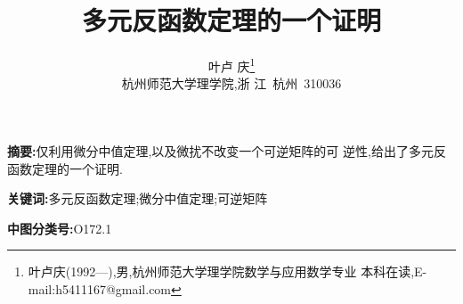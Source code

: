 \documentclass[twoside,11pt]{article}
\begin{document}
\title{\huge{\textbf{多元反函数定理的一个证明}}} \author{\small{叶卢
    庆\footnote{叶卢庆(1992---),男,杭州师范大学理学院数学与应用数学专业
      本科在读,E-mail:h5411167@gmail.com}}\\{\small{杭州师范大学理学院,浙
      江~杭州~310036}}} \date{}
\maketitle
  


\textbf{\small{摘要}:}仅利用微分中值定理,以及微扰不改变一个可逆矩阵的可
逆性,给出了多元反函数定理的一个证明. \smallskip

\textbf{\small{关键词}:}多元反函数定理;微分中值定理;可逆矩阵\smallskip

\textbf{\small{中图分类号}:}O172.1
  
\vspace{30pt} %
  
\end{document}
